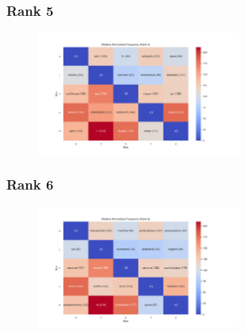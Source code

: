 \documentclass[11pt]{article}
\begin{document}
\subsubsection{Rank 5}
\begin{center}


\resizebox{\columnwidth}{!}
{
\TTRNFTable
}
\begin{figure}[h!]
  \includegraphics[width=0.6\textwidth]{figs/top_ten_rnf/rnf_t_rank_5.png}
\end{figure}
\end{center}

\pagebreak

\subsubsection{Rank 6}
\begin{center}


\resizebox{\columnwidth}{!}
{
\TTRNFTable
}
\begin{figure}[h!]
  \includegraphics[width=0.6\textwidth]{figs/top_ten_rnf/rnf_t_rank_6.png}
\end{figure}
\end{center}
\end{document}
